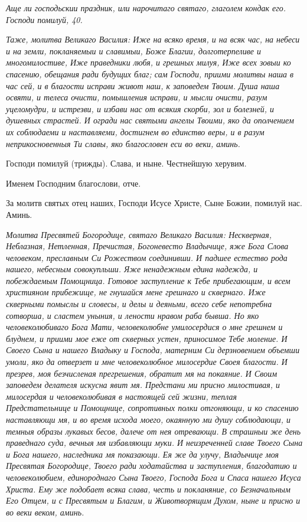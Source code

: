 \itshape Аще ли господьскии праздник, или нарочитаго святаго, глаголем кондак его.\normalfont{} Господи помилуй, 40.


\itshape Таже, молитва Великаго Василия:\normalfont{} Иже на всяко время, и на всяк час, на небеси и на земли, покланяемыи и славимыи, Боже Благии, долготерпеливе и многомилостиве, Иже праведники любя, и грешных милуя, Иже всех зовыи ко спасению, обещания ради будущих благ; сам Господи, приими молитвы наша в час сей, и в благости исправи живот наш,  к заповедем Твоим. Душа наша освяти, и телеса очисти,  помышления исправи, и мысли очисти, разум уцеломудри, и истрезви, и избави нас от всякия скорби, зол и болезней, и душевных страстей. И огради нас святыми ангелы Твоими, яко да ополчением их соблюдаеми и наставляеми, достигнем во единство веры, и в разум неприкосновенныя Ти славы, яко благословен еси во веки, аминь.

Господи помилуй (трижды). Слава, и ныне. Честнейшую херувим.

Именем Господним благослови, отче. 

За молитв святых отец наших, Господи Исусе Христе, Сыне Божии, помилуй нас. Аминь.


\itshape Молитва Пресвятей Богородице, святаго Великаго Василия:\normalfont{} Нескверная, Неблазная, Нетленная, Пречистая, Богоневесто Владычице, яже Бога Слова человеком, преславным Си Рожеством соединивши. И падшее естество рода нашего, небесным совокупльши. Яже ненадежным едина надежда, и побеждаемым Помощница. Готовое заступление к Тебе прибегающим, и всем християном прибежище, не гнушайся мене грешнаго и сквернаго. Иже скверными помыслы и словесы, и делы и деяньми, всего себе непотребна сотворша, и сластем уныния, и лености нравом раба бывша. Но яко человеколюбиваго Бога Мати, человеколюбне умилосердися о мне грешнем и блуднем, и приими  мое еже от скверных устен, приносимое Тебе моление. И Своего Сына и нашего Владыку и Господа, матерним Си дерзновением объемши умоли, яко да отверзет и мне человеколюбное милосердие Своея благости. И презрев, моя безчисленая прегрешения, обратит мя на покаяние. И Своим заповедем делателя искусна явит мя. Предстани ми присно милостивая, и милосердая и человеколюбивая в настоящей сей жизни, теплая Предстательнице и Помощнице, сопротивных полки отгоняющи, и ко спасению наставляющи мя, и во время исхода моего, окаянную ми душу соблюдающи, и темныя образы лукавых бесов, далече от нея отревающи. В страшныи же день праведнаго суда, вечныя мя избавляющи муки. И неизреченней славе Твоего Сына и Бога нашего, наследника мя показающи. Ея же да улучу, Владычице моя Пресвятая Богородице, Твоего ради ходатайства и заступления, благодатию и человеколюбием, единороднаго Сына Твоего, Господа Бога и Спаса нашего Исуса Христа. Ему же подобает всяка слава, честь и покланяние, со Безначальным Его Отцем, и с Пресвятым и Благим, и Животворящим Духом, ныне и присно и во веки веком, аминь.

